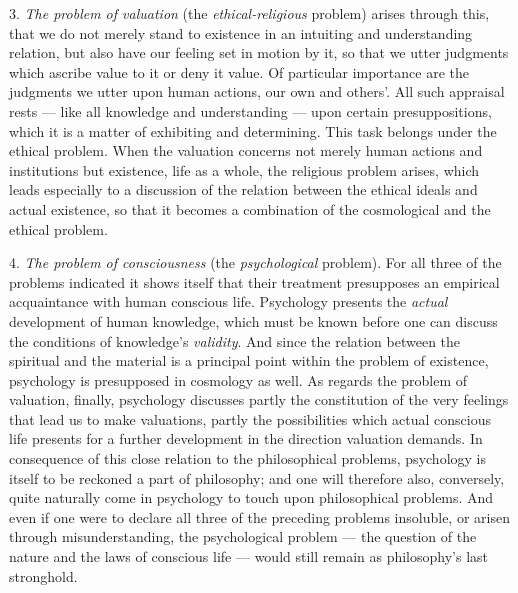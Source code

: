 \documentclass[12pt,a4paper]{book}
\newcommand{\opage}[1]{\marginnote{\footnotesize\textit{[#1]}}}
\begin{document}
3. \emph{The problem of valuation} (the \emph{ethical-religious} problem)
arises through this, that we do not merely stand to existence in an intuiting
and understanding relation, but also have our feeling set in motion by it, so
that we utter judgments which ascribe value to it or deny it value. Of
particular importance are the judgments we utter upon human actions, our own and
others'. All such appraisal rests --- like all knowledge and understanding ---
upon certain presuppositions, which it is a matter of exhibiting and
determining. This task belongs under the ethical problem. When the valuation
concerns not merely human actions and institutions but existence, life as a
whole, the religious problem arises, which leads especially to a discussion of
the relation between the ethical ideals and actual existence, so that it becomes
a combination of the cosmological and the ethical problem.

4. \emph{The problem of consciousness} (the \emph{psychological} problem).
For all three of the problems indicated it shows itself that their treatment
presupposes an empirical acquaintance with human conscious life. Psychology
presents the \emph{actual} development of human knowledge, which must be known
before one can discuss the conditions of knowledge's \emph{validity}. And since
the relation between the spiritual and the material is a principal point within
the problem of existence, psychology is presupposed in cosmology as well. As
regards the problem of valuation, finally, psychology discusses partly the
constitution of the very feelings that lead us to make valuations, partly the
possibilities which actual conscious life presents for a further development in
the direction valuation demands. In consequence of this close relation to the
philosophical problems, psychology is itself to be reckoned a part of
philosophy; and one will therefore also, conversely, quite naturally come in
psychology to touch upon philosophical problems. And even if one were to declare
all three of the preceding problems insoluble, or arisen through
misunderstanding, the psychological problem --- the question \opage{XIV}of the nature and
the laws of conscious life --- would still remain as philosophy's last
stronghold.

\medskip
\end{document}
